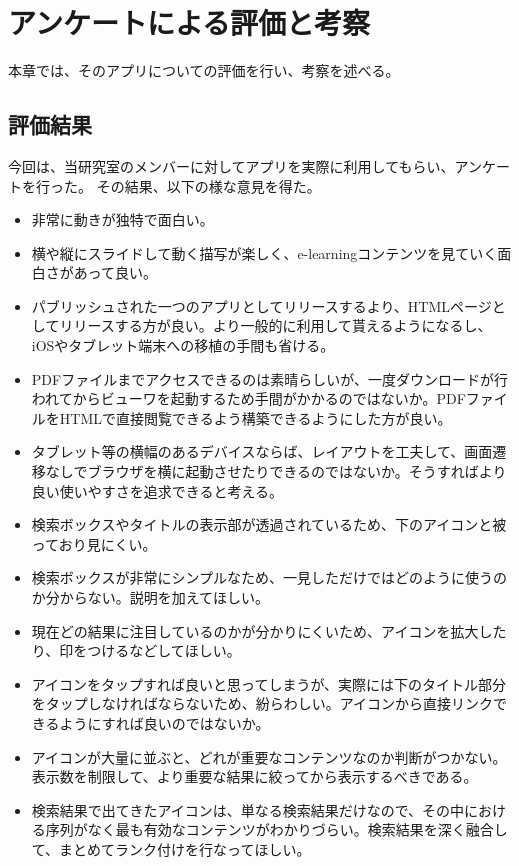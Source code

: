 \chapter{アンケートによる評価と考察}
\label{chap:result}

本章では、そのアプリについての評価を行い、考察を述べる。

\section{評価結果}
今回は、当研究室のメンバーに対してアプリを実際に利用してもらい、アンケートを行った。
その結果、以下の様な意見を得た。
\begin{itemize}
\item 非常に動きが独特で面白い。
\item 横や縦にスライドして動く描写が楽しく、e-learningコンテンツを見ていく面白さがあって良い。
\item パブリッシュされた一つのアプリとしてリリースするより、HTMLページとしてリリースする方が良い。より一般的に利用して貰えるようになるし、iOSやタブレット端末への移植の手間も省ける。
\item PDFファイルまでアクセスできるのは素晴らしいが、一度ダウンロードが行われてからビューワを起動するため手間がかかるのではないか。PDFファイルをHTMLで直接閲覧できるよう構築できるようにした方が良い。
\item タブレット等の横幅のあるデバイスならば、レイアウトを工夫して、画面遷移なしでブラウザを横に起動させたりできるのではないか。そうすればより良い使いやすさを追求できると考える。
\item 検索ボックスやタイトルの表示部が透過されているため、下のアイコンと被っており見にくい。
\item 検索ボックスが非常にシンプルなため、一見しただけではどのように使うのか分からない。説明を加えてほしい。
\item 現在どの結果に注目しているのかが分かりにくいため、アイコンを拡大したり、印をつけるなどしてほしい。
\item アイコンをタップすれば良いと思ってしまうが、実際には下のタイトル部分をタップしなければならないため、紛らわしい。アイコンから直接リンクできるようにすれば良いのではないか。
\item アイコンが大量に並ぶと、どれが重要なコンテンツなのか判断がつかない。表示数を制限して、より重要な結果に絞ってから表示するべきである。
\item 検索結果で出てきたアイコンは、単なる検索結果だけなので、その中における序列がなく最も有効なコンテンツがわかりづらい。検索結果を深く融合して、まとめてランク付けを行なってほしい。

\end{itemize}
